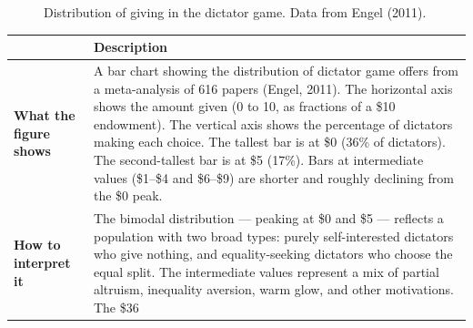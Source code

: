 \documentclass[12pt, letterpaper]{article}
\begin{document}
\begin{figure}[ht]
\centering
{}
\caption{Distribution of giving in the dictator game. Data from Engel (2011).}
\end{figure}


\begin{table}[H]
\centering
\small
\begin{tabularx}{\linewidth}{lY}
\toprule
 & Description \\
\midrule
\textbf{What the figure shows} & A bar chart showing the distribution of dictator game offers from a meta-analysis of 616 papers (Engel, 2011). The horizontal axis shows the amount given (0 to 10, as fractions of a \$10 endowment). The vertical axis shows the percentage of dictators making each choice. The tallest bar is at \$0 (36\% of dictators). The second-tallest bar is at \$5 (17\%). Bars at intermediate values (\$1--\$4 and \$6--\$9) are shorter and roughly declining from the \$0 peak. \\
\textbf{How to interpret it} & The bimodal distribution --- peaking at \$0 and \$5 --- reflects a population with two broad types: purely self-interested dictators who give nothing, and equality-seeking dictators who choose the equal split. The intermediate values represent a mix of partial altruism, inequality aversion, warm glow, and other motivations. The \$36\\%
\bottomrule
\end{tabularx}
\end{table}
\end{document}

